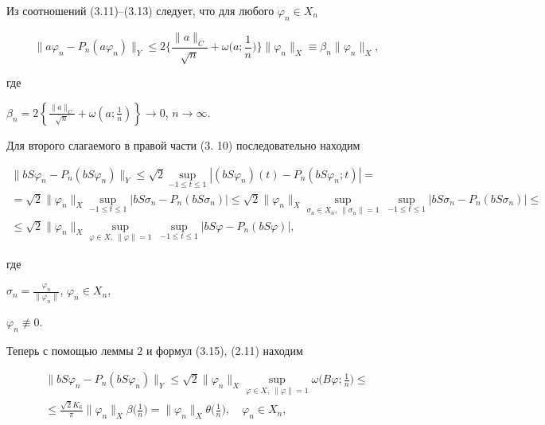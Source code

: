 Из соотношений (3.11)--(3.13) следует, что для любого $\varphi_n\in X_n$


\begin{equation}


\| a\varphi_n-P_n(a\varphi_n)\|_Y\leq 2\bigg\{\frac{\| a\|_C}


{\sqrt{n}}+\omega\bigg(a;\frac{1}{n}\bigg)\bigg\}


\|\varphi_n\|_X\equiv\beta_n\|\varphi_n\|_X, 


\end{equation}


где


$\beta_n=2\left\{\frac{\| a\|_C}{\sqrt{n}}+


\omega\left(a;\frac{1}{n}\right)\right\}\to 0$, $n\to\infty$. 





Для второго слагаемого в правой части (3. 10) последовательно находим


\begin{multline}


\| bS\varphi_n-P_n(bS\varphi_n)\|_Y\leq\sqrt{2}\sup_{-1\leq t


\leq 1}|(bS\varphi_n)(t)-P_n(bS\varphi_n;t)|=\\


%


=\sqrt{2}\|\varphi_n\|_X\sup_{-1\leq t\leq 1}| bS\sigma_n-


P_n(bS\sigma_n)|\leq\sqrt{2}\|\varphi_n\|_X\sup_{\sigma_n


\in X_n,\ \|\sigma_n\|=1}\ \sup_{-1\leq t\leq 1}| bS\sigma_n-


P_n(bS\sigma_n)|\leq\\


%


\leq\sqrt{2}\|\varphi_n\|_X\sup_{\varphi\in X,\ \|\varphi


\|=1}\ \sup_{-1\leq t\leq 1}| bS\varphi-P_n(bS\varphi)|, 


\end{multline}


где 


$\sigma_n=\frac{\varphi_n}{\|\varphi_n\|}$, $\varphi_n\in X_n$, 


$\varphi_n\not\equiv 0$. 


Теперь с помощью леммы 2 и формул (3.15), (2.11) находим


\begin{multline}


\| bS\varphi_n-P_n(bS\varphi_n)\|_Y\leq\sqrt{2}\|\varphi_n


\|_X\sup_{\varphi\in X,\ \|\varphi\|=1}\omega\bigg(B\varphi;\frac{1}


{n}\bigg)\leq \\


%


\leq\frac{\sqrt{2}K_6}{\pi}\|\varphi_n\|_X\beta\bigg(\frac{1}{n}\bigg)=


\|\varphi_n\|_X\theta\bigg(\frac{1}{n}\bigg), \quad \varphi_n\in X_n, 


\end{multline}


